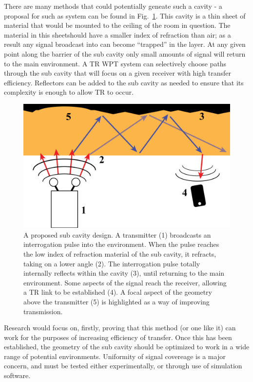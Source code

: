 There are many methods that could potentially geneate such a cavity - a proposal for such as system can be found in Fig.~\ref{fig:subCavity}. This cavity is a thin sheet of material that would be mounted to the ceiling of the room in question. The material in this sheetshould have a smaller index of refraction than air; as a result any signal broadcast into can become ``trapped'' in the layer. At any given point along the barrier of the sub cavity only small amounts of signal will return to the main environment. A TR WPT system can selectively choose paths through the sub cavity that will focus on a given receiver with high transfer efficiency. Reflectors can be added to the sub cavity as needed to ensure that its complexity is enough to allow TR to occur.

\begin{figure}[h]
\includegraphics[width=\columnwidth]{figs/future/subCavity}
\caption[Proposed ``Sub Cavity Design'']{A proposed sub cavity design. A transmitter (1) broadcasts an interrogation pulse into the environment. When the pulse reaches the low index of refraction material of the sub cavity, it refracts, taking on a lower angle (2). The interrogation pulse totally internally reflects within the cavity (3), until returning to the main environment. Some aspects of the signal reach the receiver, allowing a TR link to be established (4). A focal aspect of the geometry above the transmitter (5) is highlighted as a way of improving transmission.}
\label{fig:subCavity}
\end{figure}

Research would focus on, firstly, proving that this method (or one like it) can work for the purposes of increasing efficiency of transfer. Once this has been established, the geometry of the sub cavity should be optimized to work in a wide range of potential environments. Uniformity of signal covereage is a major concern, and must be tested either experimentally, or through use of simulation software.

